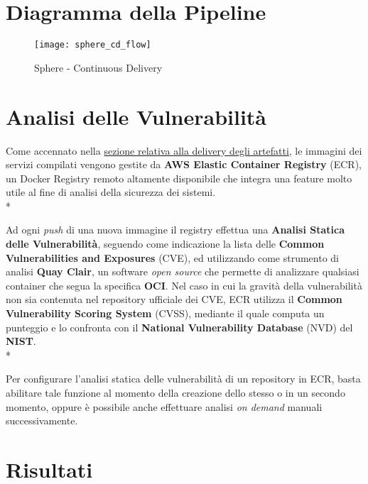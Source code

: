 \documentclass[../main.tex]{subfiles}
\begin{document}
    	\section{Diagramma della Pipeline}
    	
    	    \begin{figure}[H]
    			\centering
    			\texttt{[image: sphere\_cd\_flow]}
    			\caption{Sphere - Continuous Delivery}
    			\label{fig:sphere_cd_flow}
    	    \end{figure}
    	
    	\section{Analisi delle Vulnerabilità}
    	
    	    Come accennato nella \hyperref[sec:sphere_cd_docker]{sezione relativa alla delivery degli artefatti}, le immagini dei servizi compilati vengono gestite da \textbf{AWS Elastic Container Registry} (ECR), un Docker Registry remoto altamente disponibile che integra una feature molto utile al fine di analisi della sicurezza dei sistemi.\\*
    	    
    	    Ad ogni \emph{push} di una nuova immagine il registry effettua una \textbf{Analisi Statica delle Vulnerabilità}, seguendo come indicazione la lista delle \textbf{Common Vulnerabilities and Exposures}\cite{cve} (CVE), ed utilizzando come strumento di analisi \textbf{Quay Clair}\cite{quay_clair}, un software \emph{open source} che permette di analizzare qualsiasi container che segua la specifica \textbf{OCI}. Nel caso in cui la gravità della vulnerabilità non sia contenuta nel repository ufficiale dei CVE, ECR utilizza il \textbf{Common Vulnerability Scoring System}\cite{cvss} (CVSS), mediante il quale computa un punteggio e lo confronta con il \textbf{National Vulnerability Database}\cite{nist_nvd} (NVD) del \textbf{NIST}.\\*
    	    
    	    Per configurare l'analisi statica delle vulnerabilità di un repository in ECR, basta abilitare tale funzione al momento della creazione dello stesso o in un secondo momento, oppure è possibile anche effettuare analisi \emph{on demand} manuali successivamente.
    	
    	\section{Risultati}
    	
\end{document}
